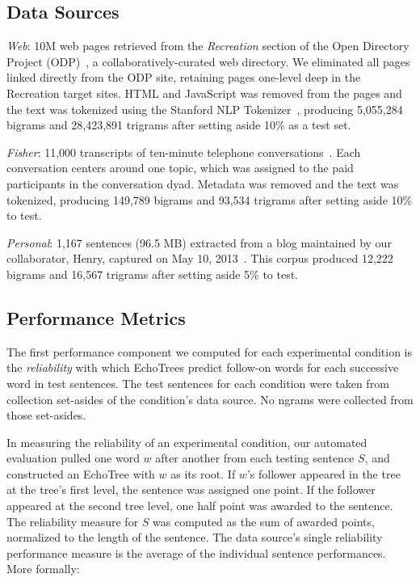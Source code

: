 \documentclass{sigchi}
\begin{document}
\subsection{Data Sources}
{\em Web}: 10M web pages retrieved from the {\em Recreation} section of the Open Directory Project (ODP)~\cite{dmoz}, a collaboratively-curated web directory. We eliminated all pages linked directly from the ODP site, retaining pages one-level deep in the Recreation target sites. HTML and JavaScript was removed from the pages and the text was tokenized using the Stanford NLP Tokenizer~\cite{tokenizer}, producing 5,055,284 bigrams and 28,423,891 trigrams after setting aside 10\% as a test set.

{\em Fisher}: 11,000 transcripts of ten-minute telephone conversations~\cite{fisher1,fisher2}. Each conversation centers around one topic, which was assigned to the paid participants in the conversation dyad. Metadata was removed and the text was tokenized, producing 149,789 bigrams and 93,534 trigrams after setting aside 10\% to test.

{\em Personal}: 1,167 sentences (96.5 MB) extracted from a blog maintained by our collaborator, Henry, captured on May 10, 2013~\cite{henryBlog}. This corpus produced 12,222 bigrams and 16,567 trigrams after setting aside 5\% to test.

\subsection{Performance Metrics}

The first performance component we computed for each experimental
condition is the {\em reliability} with which EchoTrees predict
follow-on words for each successive word in test sentences. The test
sentences for each condition were taken from collection set-asides of
the condition's data source. No ngrams were collected from those
set-asides. 

In measuring the reliability of an experimental condition, our
automated evaluation pulled one word $w$ after another from each
testing sentence $S$, and constructed an EchoTree with $w$ as its
root. If $w$'s follower appeared in the tree at the tree's first
level, the sentence was assigned one point. If the follower appeared
at the second tree level, one half point was awarded to the
sentence. The reliability measure for $S$ was computed as the sum of
awarded points, normalized to the length of the sentence. The data
source's single reliability performance measure is the average of the
individual sentence performances. More formally:
\end{document}

